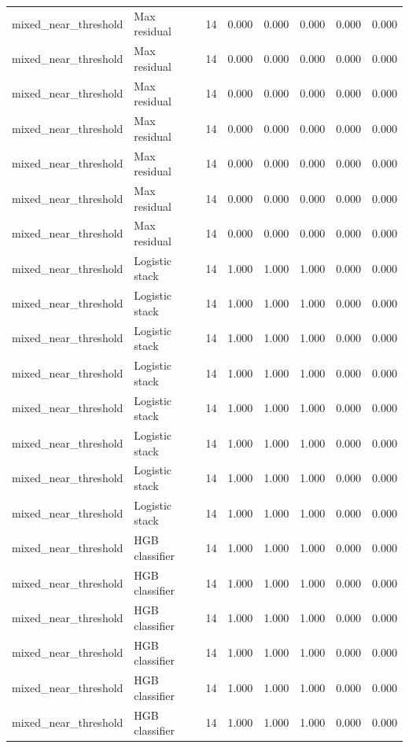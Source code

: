 {\begin{longtable}{llrrrrrr}
mixed\_near\_threshold & Max residual & 14 & 0.000 & 0.000 & 0.000 & 0.000 & 0.000 \\
mixed\_near\_threshold & Max residual & 14 & 0.000 & 0.000 & 0.000 & 0.000 & 0.000 \\
mixed\_near\_threshold & Max residual & 14 & 0.000 & 0.000 & 0.000 & 0.000 & 0.000 \\
mixed\_near\_threshold & Max residual & 14 & 0.000 & 0.000 & 0.000 & 0.000 & 0.000 \\
mixed\_near\_threshold & Max residual & 14 & 0.000 & 0.000 & 0.000 & 0.000 & 0.000 \\
mixed\_near\_threshold & Max residual & 14 & 0.000 & 0.000 & 0.000 & 0.000 & 0.000 \\
mixed\_near\_threshold & Max residual & 14 & 0.000 & 0.000 & 0.000 & 0.000 & 0.000 \\
mixed\_near\_threshold & Logistic stack & 14 & 1.000 & 1.000 & 1.000 & 0.000 & 0.000 \\
mixed\_near\_threshold & Logistic stack & 14 & 1.000 & 1.000 & 1.000 & 0.000 & 0.000 \\
mixed\_near\_threshold & Logistic stack & 14 & 1.000 & 1.000 & 1.000 & 0.000 & 0.000 \\
mixed\_near\_threshold & Logistic stack & 14 & 1.000 & 1.000 & 1.000 & 0.000 & 0.000 \\
mixed\_near\_threshold & Logistic stack & 14 & 1.000 & 1.000 & 1.000 & 0.000 & 0.000 \\
mixed\_near\_threshold & Logistic stack & 14 & 1.000 & 1.000 & 1.000 & 0.000 & 0.000 \\
mixed\_near\_threshold & Logistic stack & 14 & 1.000 & 1.000 & 1.000 & 0.000 & 0.000 \\
mixed\_near\_threshold & Logistic stack & 14 & 1.000 & 1.000 & 1.000 & 0.000 & 0.000 \\
mixed\_near\_threshold & HGB classifier & 14 & 1.000 & 1.000 & 1.000 & 0.000 & 0.000 \\
mixed\_near\_threshold & HGB classifier & 14 & 1.000 & 1.000 & 1.000 & 0.000 & 0.000 \\
mixed\_near\_threshold & HGB classifier & 14 & 1.000 & 1.000 & 1.000 & 0.000 & 0.000 \\
mixed\_near\_threshold & HGB classifier & 14 & 1.000 & 1.000 & 1.000 & 0.000 & 0.000 \\
mixed\_near\_threshold & HGB classifier & 14 & 1.000 & 1.000 & 1.000 & 0.000 & 0.000 \\
mixed\_near\_threshold & HGB classifier & 14 & 1.000 & 1.000 & 1.000 & 0.000 & 0.000 \\

\end{longtable}}
